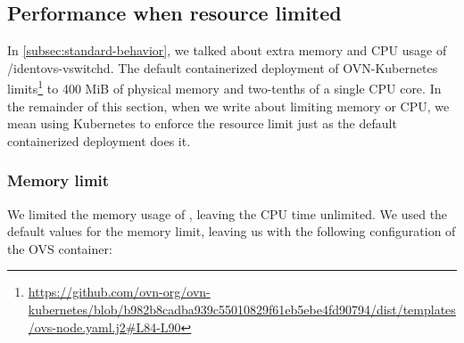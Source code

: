 

\subsection{Performance when resource limited}

In \cref{subsec:standard-behavior}, we talked about extra memory and CPU usage of /ident{ovs-vswitchd}. The default containerized deployment of OVN-Kubernetes limits\footnote{\url{https://github.com/ovn-org/ovn-kubernetes/blob/b982b8cadba939c55010829f61eb5ebe4fd90794/dist/templates/ovs-node.yaml.j2\#L84-L90}}  to 400 MiB of physical memory and two-tenths of a single CPU core. In the remainder of this section, when we write about limiting memory or CPU, we mean using Kubernetes to enforce the resource limit just as the default containerized deployment does it.

\subsubsection{Memory limit}
\label{subsec:memory}
We limited the memory usage of , leaving the CPU time unlimited. We used the default values for the memory limit, leaving us with the following configuration of the OVS container:

